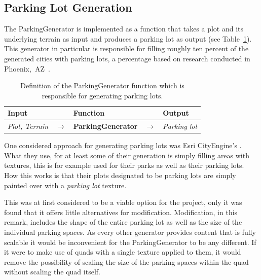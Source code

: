 \subsection{Parking Lot Generation}
The ParkingGenerator is implemented as a function that takes a plot and its underlying terrain as input and produces a parking lot as output (see Table~\ref{table:parking}).
This generator in particular is responsible for filling roughly ten percent of the generated cities with parking lots, a percentage based on research conducted in Phoenix,~AZ~\cite{parking_percent}.
\begin{table}[H]
   \centering
   \begin{tabular}{lllll}
     \textbf{Input}                           &               & \textbf{Function}            &               & \textbf{Output}         \\
     \midrule
     \textit{Plot, Terrain}                   & $\rightarrow$ & \textbf{ParkingGenerator}       & $\rightarrow$ & \textit{Parking lot}           \\
     \bottomrule
   \end{tabular}

   \caption{Definition of the ParkingGenerator function which is responsible for generating parking lots.}
   \label{table:parking}
 \end{table}
 \vspace{-0.4cm}


One considered approach for generating parking lots was Esri CityEngine's \cite{Esri}.  %
What they use, for at least some of their generation is simply filling areas with textures, this is for example used for their parks as well as their parking lots. 
How this works is that their plots designated to be parking lots are simply painted over with a \textit{parking lot} texture.
 
This was at first considered to be a viable option for the project, only it was found that it offers little alternatives for modification. 
Modification, in this remark, includes the shape of the entire parking lot as well as the size of the individual parking spaces.
As every other generator provides content that is fully scalable it would be inconvenient for the ParkingGenerator to be any different.
If it were to make use of quads with a single texture applied to them, it would remove the possibility of scaling the size of the parking spaces within the quad without scaling the quad itself.

